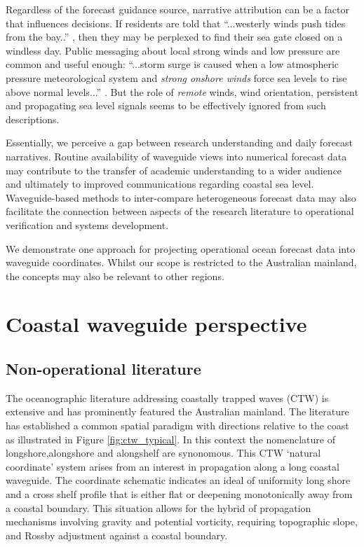Regardless of the forecast guidance source, narrative attribution can be a factor that influences decisions.  
If residents are told that ``...westerly winds push tides from the bay..'' \citep{urlMW:2018}, then they may be perplexed to find their sea gate closed on a windless day.  Public messaging about local strong winds and low pressure are common and useful enough:
``...storm surge is caused when a low atmospheric pressure meteorological system and \emph{strong onshore winds} force sea levels to rise above normal levels...''
\citep{urlBris:2018}.  But the role of \emph{remote} winds, wind orientation, persistent and propagating sea level signals seems to be effectively ignored from such descriptions.  


Essentially, we perceive a gap between research understanding and daily forecast narratives.
Routine availability of waveguide views into numerical forecast data may contribute to the transfer of academic understanding to a wider audience and ultimately to improved communications regarding coastal sea level.
Waveguide-based methods to inter-compare heterogeneous forecast data may also facilitate the connection between aspects of the research literature to operational verification and systems development.

We demonstrate one approach for projecting operational ocean forecast data into waveguide coordinates.  Whilst our scope is restricted to the Australian mainland, the concepts may also be relevant to other regions.


\section{Coastal waveguide perspective}
\label{sec:ctw_background}

\subsection{Non-operational literature}
The oceanographic literature addressing coastally trapped waves (CTW) is extensive and has prominently featured the Australian mainland. 
The literature has established a common spatial paradigm \citep{Brink:1991dl}  with directions relative to the coast as illustrated in Figure \ref{fig:ctw_typical}. In this context the nomenclature of longshore,alongshore and alongshelf are synonomous. This CTW `natural coordinate' system \citep{gill1982atmosphere} arises from an interest in propagation along a long coastal waveguide. The coordinate schematic indicates an ideal of uniformity long shore and a cross shelf profile that is either flat or deepening monotonically away from a coastal boundary.  
This situation allows for the hybrid of propagation mechanisms involving gravity and potential vorticity, requiring topographic slope, and Rossby adjustment against a coastal boundary.   

